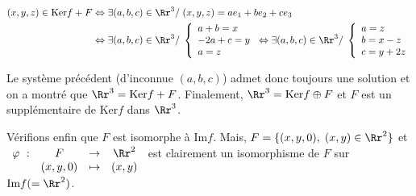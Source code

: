 {\begin{enumerate}
{\begin{align*}
(x,y,z)\in\mbox{Ker}f+F&\Leftrightarrow\exists(a,b,c)\in\Rr^3/\;(x,y,z)=ae_1+be_2+ce_3\\
 &\Leftrightarrow\exists(a,b,c)\in\Rr^3/\;
\left\{
\begin{array}{l}
a+b=x\\
-2a+c=y\\
a=z
\end{array}
\right.
\Leftrightarrow
\exists(a,b,c)\in\Rr^3/\;\left\{
\begin{array}{l}
a=z\\
b=x-z\\
c=y+2z
\end{array}
\right.
\end{align*}

Le système précédent (d'inconnue $(a,b,c)$) admet donc toujours une solution et on a montré que $\Rr^3=\mbox{Ker}f+F$.
Finalement, $\Rr^3=\mbox{Ker}f\oplus F$ et $F$ est un supplémentaire de $\mbox{Ker}f$ dans $\Rr^3$.

Vérifions enfin que $F$ est isomorphe à $\mbox{Im}f$. Mais, $F=\{(x,y,0),\;(x,y)\in\Rr^2\}$ et
$\begin{array}[t]{cccc}
\varphi~:&F&\rightarrow&\Rr^2\\
 &(x,y,0)&\mapsto&(x,y)
\end{array}$ est clairement un isomorphisme de $F$ sur $\mbox{Im}f(=\Rr^2)$.}
\end{enumerate}
}